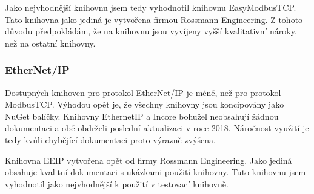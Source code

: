 Jako nejvhodnější knihovnu jsem tedy vyhodnotil knihovnu EasyModbusTCP. Tato knihovna jako jediná je vytvořena firmou Rossmann Engineering. Z tohoto důvodu předpokládám, že na knihovnu jsou vyvíjeny vyšší kvalitativní nároky, než na ostatní knihovny.  

\begin{table}[H]\centering
    \caption{Seznam dostupných knihoven pro protokol ModbusTCP}
    \label{tab:modbus}
\end{table}

\subsubsection{EtherNet/IP}
Dostupných knihoven pro protokol EtherNet/IP je méně, než pro protokol ModbusTCP. Výhodou opět je, že všechny knihovny jsou koncipovány jako NuGet balíčky. Knihovny EthernetIP a Incore bohužel neobsahují žádnou dokumentaci a obě obdrželi poslední aktualizaci v roce 2018. Náročnost využití je tedy kvůli chybějící dokumentaci proto výrazně zvýšena.

Knihovna EEIP vytvořena opět od firmy Rossmann Engineering. Jako jediná obsahuje kvalitní dokumentaci s ukázkami použití knihovny. Tuto knihovnu jsem vyhodnotil jako nejvhodnější k použití v testovací knihovně.

